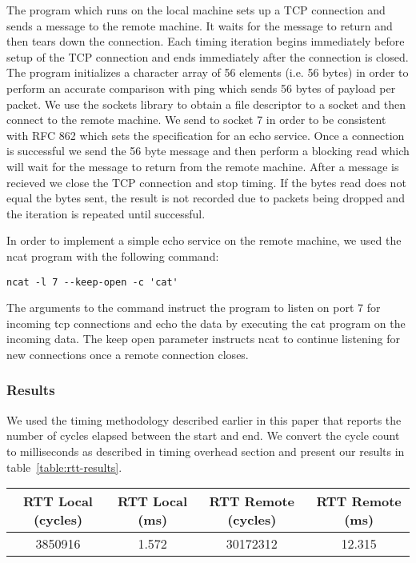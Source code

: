 The program which runs on the local machine sets up a TCP connection and sends
a message to the remote machine. It waits for the message to return and then
tears down the connection. Each timing iteration begins immediately before
setup of the TCP connection and ends immediately after the connection is
closed. The program initializes a character array of 56 elements (i.e. 56
bytes) in order to perform an accurate comparison with ping which sends 56
bytes of payload per packet.  We use the sockets library to obtain a file
descriptor to a socket and then connect to the remote machine. We send to
socket 7 in order to be consistent with RFC 862 \cite{rfc862} which sets the
specification for an echo service. Once a connection is successful we send the
56 byte message and then perform a blocking read which will wait for the
message to return from the remote machine. After a message is recieved we close
the TCP connection and stop timing. If the bytes read does not equal the bytes
sent, the result is not recorded due to packets being dropped and the iteration
is repeated until successful.

In order to implement a simple echo service on the remote machine, we used the
ncat program with the following command: 
\begin{verbatim}
ncat -l 7 --keep-open -c 'cat'
\end{verbatim}
The arguments to the command instruct the program to listen on port 7 for
incoming tcp connections and echo the data by executing the cat program on the
incoming data. The keep open parameter instructs ncat to continue listening for
new connections once a remote connection closes.

\subsubsection{Results}

We used the timing methodology described earlier in this paper that reports the
number of cycles elapsed between the start and end. We convert the cycle count
to milliseconds as described in timing overhead section and present our results
in table~\ref{table:rtt-results}.

\begin{table*}[b]
\begin{tabular}{|c|c|c|c|}
\hline
RTT Local (cycles) & RTT Local (ms) & RTT Remote (cycles) & RTT Remote (ms) \\ \hline
3850916            & 1.572          & 30172312            & 12.315          \\ \hline
\end{tabular}
\caption{RTT experimental results}
\label{table:rtt-results}
\end{table*}

